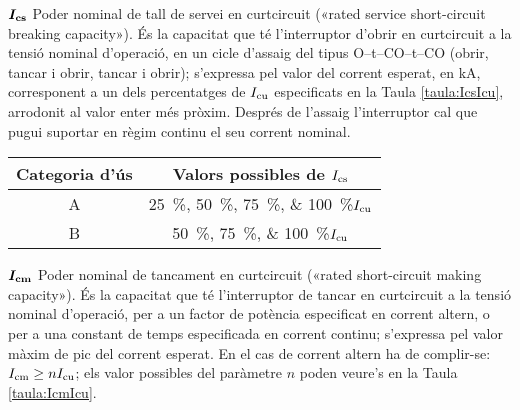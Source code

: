 \begin{list}{}
    \item[$\boldsymbol{I_\mathrm{cs}}$] Poder nominal de tall de servei en curtcircuit («rated service  short-circuit breaking capacity»). És la capacitat que té l'interruptor d'obrir en curtcircuit a la tensió nominal d'operació, en un cicle d'assaig del tipus O--t--CO--t--CO (obrir, tancar i obrir, tancar i obrir); s'expressa pel valor  del corrent esperat, en kA, corresponent a un dels percentatges de $I_\mathrm{cu}$ especificats en la Taula \vref{taula:IcsIcu}, arrodonit al valor enter més pròxim. Després de l'assaig l'interruptor cal que pugui suportar en règim continu  el seu corrent nominal.

         \begin{center}
            \label{taula:IcsIcu}
           \begin{tabular}{cc}
           \toprule[1pt]
           Categoria d'ús &  Valors possibles de $I_\mathrm{cs}$ \\
           \midrule
           A & \SIlist[list-units = brackets]{25;50;75;100}{\%}$ I_\mathrm{cu}$ \\
           B & \SIlist[list-units = brackets]{50;75;100}{\%}$ I_\mathrm{cu}$  \\
           \bottomrule[1pt]
           \end{tabular}
         \end{center}
    \item[$\boldsymbol{I_\mathrm{cm}}$] Poder nominal de tancament en curtcircuit («rated short-circuit making capacity»). És la capacitat que té l'interruptor de tancar en curtcircuit a la tensió nominal d'operació, per a un factor de potència especificat en corrent altern, o per a una constant de temps especificada en corrent continu; s'expressa pel valor màxim de pic del corrent esperat. En el cas de corrent altern ha de complir-se: $I_\mathrm{cm} \geq n I_\mathrm{cu}$; els valor possibles del paràmetre $n$ poden veure's en la Taula \vref{taula:IcmIcu}.


\end{list}
